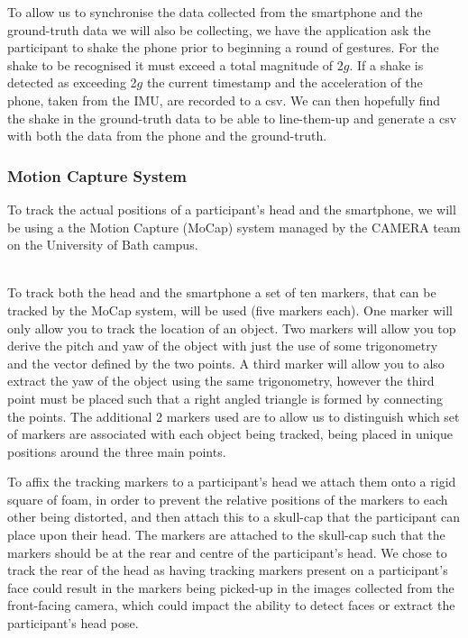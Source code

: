 To allow us to synchronise the data collected from the smartphone and the ground-truth data we will also be collecting, we have the application ask the participant to shake the phone prior to beginning a round of gestures. For the shake to be recognised it must exceed a total magnitude of 2$g$. If a shake is detected as exceeding 2$g$ the current timestamp and the acceleration of the phone, taken from the IMU, are recorded to a csv. We can then hopefully find the shake in the ground-truth data to be able to line-them-up and generate a csv with both the data from the phone and the ground-truth.

\subsubsection{Motion Capture System}\nl
To track the actual positions of a participant's head and the smartphone, we will be using a the Motion Capture (MoCap) system managed by the CAMERA team on the University of Bath campus.

\nl{}\\
To track both the head and the smartphone a set of ten markers, that can be tracked by the MoCap system, will be used (five markers each).
One marker will only allow you to track the location of an object. Two markers will allow you top derive the pitch and yaw of the object with just the use of some trigonometry and the vector defined by the two points. A third marker will allow you to also extract the yaw of the object using the same trigonometry, however the third point must be placed such that a right angled triangle is formed by connecting the points.
The additional 2 markers used are to allow us to distinguish which set of markers are associated with each object being tracked, being placed in unique positions around the three main points.

To affix the tracking markers to a participant's head we attach them onto a rigid square of foam, in order to prevent the relative positions of the markers to each other being distorted, and then attach this to a skull-cap that the participant can place upon their head.
The markers are attached to the skull-cap such that the markers should be at the rear and centre of the participant's head. 
We chose to track the rear of the head as having tracking markers present on a participant's face could result in the markers being picked-up in the images collected from the front-facing camera, which could impact the ability to detect faces or extract the participant's head pose.

